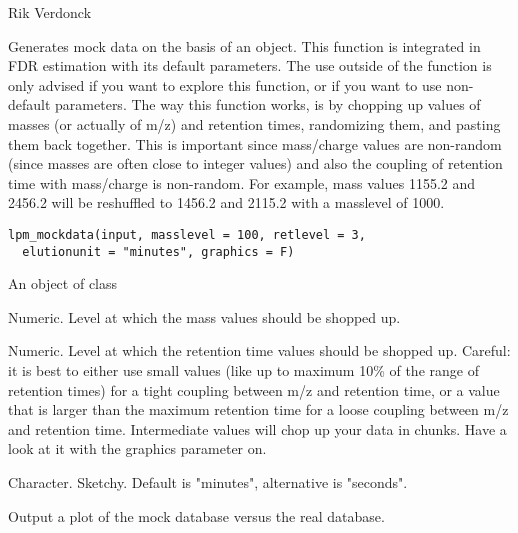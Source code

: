 \documentclass[letterpaper]{book}
\begin{document}
%
\begin{Author}\relax
Rik Verdonck
\end{Author}
%
\begin{Description}\relax
Generates mock data on the basis of an  object. This function is integrated in  FDR estimation with its default parameters. The use outside of the  function is only advised if you want to explore this function, or if you want to use non-default parameters. The way this function works, is by chopping up values of masses (or actually of m/z) and retention times, randomizing them, and pasting them back together. This is important since mass/charge values are non-random (since masses are often close to integer values) and also the coupling of retention time with mass/charge is non-random. For example, mass values 1155.2 and 2456.2 will be reshuffled to 1456.2 and 2115.2 with a masslevel of 1000.
\end{Description}
%
\begin{Usage}
\begin{verbatim}
lpm_mockdata(input, masslevel = 100, retlevel = 3,
  elutionunit = "minutes", graphics = F)
\end{verbatim}
\end{Usage}
%
\begin{Arguments}
\begin{ldescription}
\item[\code{input}] An object of class 

\item[\code{masslevel}] Numeric. Level at which the mass values should be shopped up.

\item[\code{retlevel}] Numeric. Level at which the retention time values should be shopped up. Careful: it is best to either use small values (like up to maximum 10\% of the range of retention times) for a tight coupling between m/z and retention time, or a value that is larger than the maximum retention time for a loose coupling between m/z and retention time. Intermediate values will chop up your data in chunks. Have a look at it with the graphics parameter on.

\item[\code{elutionunit}] Character. Sketchy. Default is "minutes", alternative is "seconds".

\item[\code{graphics}] Output a plot of the mock database versus the real database.
\end{ldescription}
\end{Arguments}
\end{document}

